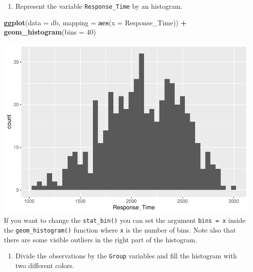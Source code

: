 \documentclass[
]{article}
\newenvironment{Shaded}{\begin{snugshade}}{\end{snugshade}}
\newcommand{\AttributeTok}[1]{\textcolor[rgb]{0.13,0.29,0.53}{#1}}
\newcommand{\DecValTok}[1]{\textcolor[rgb]{0.00,0.00,0.81}{#1}}
\newcommand{\FunctionTok}[1]{\textcolor[rgb]{0.13,0.29,0.53}{\textbf{#1}}}
\newcommand{\NormalTok}[1]{#1}
\newcommand{\SpecialCharTok}[1]{\textcolor[rgb]{0.81,0.36,0.00}{\textbf{#1}}}
\providecommand{\tightlist}{%
  \setlength{\itemsep}{0pt}\setlength{\parskip}{0pt}}
\begin{document}
\begin{enumerate}
\def\labelenumi{\alph{enumi}.}
\setcounter{enumi}{4}
\tightlist
\item
  Represent the variable \texttt{Response\_Time} by an histogram.
\end{enumerate}

\begin{Shaded}
\begin{Highlighting}[]
\FunctionTok{ggplot}\NormalTok{(}\AttributeTok{data =}\NormalTok{ db, }
       \AttributeTok{mapping =} \FunctionTok{aes}\NormalTok{(}\AttributeTok{x =}\NormalTok{ Response\_Time)) }\SpecialCharTok{+} 
  \FunctionTok{geom\_histogram}\NormalTok{(}\AttributeTok{bins =} \DecValTok{40}\NormalTok{)}
\end{Highlighting}
\end{Shaded}

\includegraphics{Simulated_example_files/figure-latex/unnamed-chunk-7-1.pdf}
If you want to change the \texttt{stat\_bin()} you can set the argument
\texttt{bins\ =\ x} inside the \texttt{geom\_histogram()} function where
\texttt{x} is the number of bins. Note also that there are some visible
outliers in the right part of the histogram.

\begin{enumerate}
\def\labelenumi{\alph{enumi}.}
\setcounter{enumi}{5}
\tightlist
\item
  Divide the observations by the \texttt{Group} variables and fill the
  histogram with two different colors.
\end{enumerate}
\end{document}
